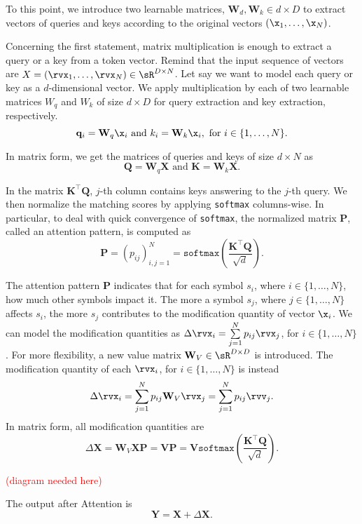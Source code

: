 To this point, we introduce two learnable matrices, $\mathbf{W}_d, \mathbf{W}_k\in d\times D$ to extract vectors of queries and keys according to the original vectors $(\x_1,\ldots,\x_N)$.

Concerning the first statement, matrix multiplication is enough to extract a query or a key from a token vector. Remind that the input sequence of vectors are $X=(\rvx_1,\ldots,\rvx_N)\in\sR^{D\times N}$. Let say we want to model each query or key as a $d$-dimensional vector. We apply multiplication by each of two learnable matrices $W_q$ and $W_k$ of size $d\times D$ for query extraction and key extraction, respectively.
$$\mathbf{q}_i = \mathbf{W}_q\x_i \text{ and } k_i = \mathbf{W}_k\x_i, \text{ for } i \in \{1,\ldots, N\}.$$

In matrix form, we get the matrices of queries and keys of size $d\times N$ as
$$\mathbf{Q} = \mathbf{W}_q\mathbf{X} \text{ and } \mathbf{K} = \mathbf{W}_k\mathbf{X}.$$

In the matrix $\mathbf{K}^\top \mathbf{Q}$, $j$-th column contains keys answering to the $j$-th query. We then normalize the matching scores by applying \texttt{softmax} columns-wise. In particular, to deal with quick convergence of \texttt{softmax}, the normalized matrix $\mathbf{P}$, called  an attention pattern, is computed as
$$\mathbf{P}=(p_{ij})_{i,j=1}^N=\texttt{softmax}\left(\dfrac{\mathbf{K}^\top \mathbf{Q}}{\sqrt{d}}\right).$$

The attention pattern $\mathbf{P}$ indicates that for each symbol $s_i$, where $i\in\{1,\ldots, N\}$, how much other symbols impact it. The more a symbol $s_j$, where $j\in\{1,\ldots, N\}$ affects $s_i$, the more $s_j$ contributes to the modification quantity of vector $\x_i$. We can model the modification quantities as
$\Delta \rvx_i = \sum\limits_{j=1}^N p_{ij}\rvx_j$, for $i\in\{1,\ldots,N\}$. For more flexibility, a new value matrix $\mathbf{W}_V\in\sR^{D\times D}$ is introduced. The modification quantity of each $\rvx_i$, for $i\in\{1,\ldots, N\}$ is instead
$$\Delta \rvx_i = \sum\limits_{j=1}^N p_{ij}\mathbf{W}_V\rvx_j = \sum\limits_{j=1}^N p_{ij}\rvv_j.$$
In matrix form, all modification quantities are
$$\Delta \mathbf{X} = \mathbf{W}_V \mathbf{X} \mathbf{P}  = \mathbf{V}\mathbf{P} = \mathbf{V}\texttt{softmax}\left(\dfrac{\mathbf{K}^\top \mathbf{Q}}{\sqrt{d}}\right).$$

\textcolor{red}{(diagram needed here)}

The output after Attention is
$$\mathbf{Y} = \mathbf{X} + \Delta \mathbf{X}.$$

